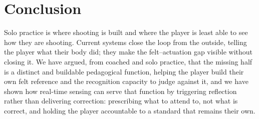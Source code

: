 \documentclass[sigconf]{acmart}
\begin{document}
\section{Conclusion}

Solo practice is where shooting is built and where the player is least able to see how they are shooting. Current systems close the loop from the outside, telling the player what their body did; they make the felt--actuation gap visible without closing it. We have argued, from coached and solo practice, that the missing half is a distinct and buildable pedagogical function, helping the player build their own felt reference and the recognition capacity to judge against it, and we have shown how real-time sensing can serve that function by triggering reflection rather than delivering correction: prescribing what to attend to, not what is correct, and holding the player accountable to a standard that remains their own.

% 
% 
\end{document}
